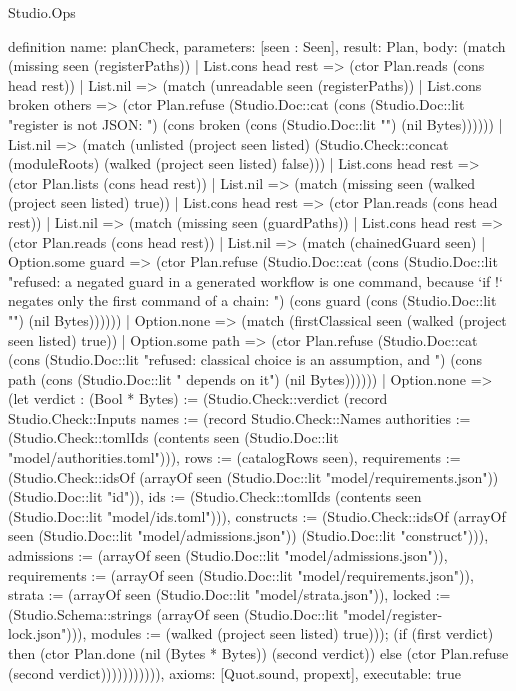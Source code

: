 \begin{lexlean}{Studio.Ops}
\begin{semanticmodule}
{definition{
  name: planCheck,
  parameters: [seen : Seen],
  result: Plan,
  body: (match (missing seen (registerPaths))
    | List.cons head rest => (ctor Plan.reads (cons head rest))
    | List.nil => (match (unreadable seen (registerPaths))
      | List.cons broken others => (ctor Plan.refuse (Studio.Doc::cat (cons (Studio.Doc::lit "register is not JSON: ") (cons broken (cons (Studio.Doc::lit "\n") (nil Bytes))))))
      | List.nil => (match (unlisted (project seen listed) (Studio.Check::concat (moduleRoots) (walked (project seen listed) false)))
      | List.cons head rest => (ctor Plan.lists (cons head rest))
      | List.nil => (match (missing seen (walked (project seen listed) true))
      | List.cons head rest => (ctor Plan.reads (cons head rest))
      | List.nil => (match (missing seen (guardPaths))
      | List.cons head rest => (ctor Plan.reads (cons head rest))
      | List.nil => (match (chainedGuard seen)
      | Option.some guard => (ctor Plan.refuse (Studio.Doc::cat (cons (Studio.Doc::lit "refused: a negated guard in a generated workflow is one command, because `if !` negates only the first command of a chain: ") (cons guard (cons (Studio.Doc::lit "\n") (nil Bytes))))))
      | Option.none => (match (firstClassical seen (walked (project seen listed) true))
      | Option.some path => (ctor Plan.refuse (Studio.Doc::cat (cons (Studio.Doc::lit "refused: classical choice is an assumption, and ") (cons path (cons (Studio.Doc::lit " depends on it\n") (nil Bytes))))))
      | Option.none => (let verdict : (Bool * Bytes) := (Studio.Check::verdict (record Studio.Check::Inputs {names := (record Studio.Check::Names {authorities := (Studio.Check::tomlIds (contents seen (Studio.Doc::lit "model/authorities.toml"))), rows := (catalogRows seen), requirements := (Studio.Check::idsOf (arrayOf seen (Studio.Doc::lit "model/requirements.json")) (Studio.Doc::lit "id")), ids := (Studio.Check::tomlIds (contents seen (Studio.Doc::lit "model/ids.toml"))), constructs := (Studio.Check::idsOf (arrayOf seen (Studio.Doc::lit "model/admissions.json")) (Studio.Doc::lit "construct"))}), admissions := (arrayOf seen (Studio.Doc::lit "model/admissions.json")), requirements := (arrayOf seen (Studio.Doc::lit "model/requirements.json")), strata := (arrayOf seen (Studio.Doc::lit "model/strata.json")), locked := (Studio.Schema::strings (arrayOf seen (Studio.Doc::lit "model/register-lock.json"))), modules := (walked (project seen listed) true)})); (if (first verdict) then (ctor Plan.done (nil (Bytes * Bytes)) (second verdict)) else (ctor Plan.refuse (second verdict))))))))))),
  axioms: [Quot.sound, propext],
  executable: true
}

}
\end{semanticmodule}
\end{lexlean}
